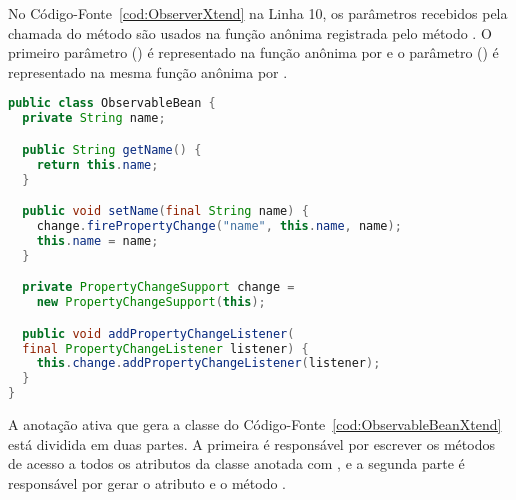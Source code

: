 No Código-Fonte~\ref{cod:ObserverXtend} na Linha 10, os parâmetros recebidos pela chamada do método  são usados na função anônima registrada pelo método . O primeiro parâmetro () é representado na função anônima por  e o parâmetro () é representado na mesma função anônima por .

\begin{lstlisting}[language=Java, caption={Classe Java \textbf{ObservableBean} gerada pelo compilador Xtend}, label={cod:ObservableBeanXtend}]
public class ObservableBean {
  private String name;

  public String getName() {
    return this.name;
  }

  public void setName(final String name) {
    change.firePropertyChange("name", this.name, name);
    this.name = name;
  }

  private PropertyChangeSupport change = 
    new PropertyChangeSupport(this);

  public void addPropertyChangeListener(
  final PropertyChangeListener listener) {
    this.change.addPropertyChangeListener(listener);
  }
}
\end{lstlisting}

A anotação ativa  que gera a classe do Código-Fonte~\ref{cod:ObservableBeanXtend} está dividida em duas partes. A primeira é responsável por escrever os métodos de acesso a todos os atributos da classe anotada com , e a segunda parte é responsável por gerar o atributo  e o método .
